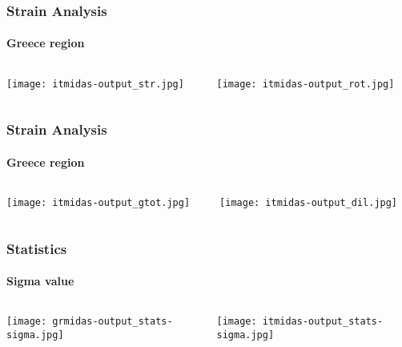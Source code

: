 \begin{frame}
 \frametitle{Strain Analysis}
 \framesubtitle{Greece region}
 \label{ch4:}
   
  \begin{columns}
    \begin{column}{0.5\textwidth}
      
      \texttt{[image: itmidas-output\_str.jpg]}   
    \end{column}
    \begin{column}{0.5\textwidth}
    \begin{center}
      
      \texttt{[image: itmidas-output\_rot.jpg]}     
    \end{center}
    \end{column}
  \end{columns}

\end{frame}
\note{}

\begin{frame}
 \frametitle{Strain Analysis}
 \framesubtitle{Greece region}
 \label{ch4:}
   
  \begin{columns}
    \begin{column}{0.5\textwidth}
      \texttt{[image: itmidas-output\_gtot.jpg]}   
    \end{column}
    \begin{column}{0.5\textwidth}
    \begin{center}
      \texttt{[image: itmidas-output\_dil.jpg]}     
    \end{center}
    \end{column}
  
  \end{columns}

\end{frame}
\note{}

\begin{frame}
 \frametitle{Statistics}
 \framesubtitle{Sigma value}
 \label{ch4:}
   
  \begin{columns}
    \begin{column}{0.5\textwidth}
      \texttt{[image: grmidas-output\_stats-sigma.jpg]}   
    \end{column}
    \begin{column}{0.5\textwidth}
    \begin{center}
      \texttt{[image: itmidas-output\_stats-sigma.jpg]}     
    \end{center}
    \end{column}
  
  \end{columns}

\end{frame}
\note{}

